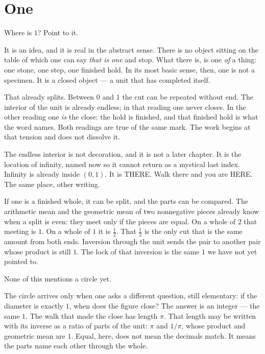 \documentclass[10pt,a4paper]{article}
\theoremstyle{plain}
\theoremstyle{definition}
\theoremstyle{remark}
\begin{document}
\newpage

\tableofcontents
\newpage

\section{One}

Where is \(1\)?
Point to it.

It is an idea, and it is real in the abstract sense.
There is no object sitting on the table of which one can say \emph{that is one} and stop.
What there is, is one \emph{of} a thing: one stone, one step, one finished hold.
In its most basic sense, then, one is not a specimen.
It is a closed object --- a unit that has completed itself.

That already splits.
Between \(0\) and \(1\) the cut can be repeated without end.
The interior of the unit is already endless; in that reading one never closes.
In the other reading one \emph{is} the close: the hold is finished, and that finished hold is what the word names.
Both readings are true of the same mark.
The work begins at that tension and does not dissolve it.

The endless interior is not decoration, and it is not a later chapter.
It is the location of infinity, named now so it cannot return as a mystical last index.
Infinity is already inside \((0,1)\).
It is THERE.
Walk there and you are HERE.
The same place, other writing.

If one is a finished whole, it can be split, and the parts can be compared.
The arithmetic mean and the geometric mean of two nonnegative pieces already know when a split is even: they meet only if the pieces are equal.
On a whole of \(2\) that meeting is \(1\).
On a whole of \(1\) it is \(\tfrac12\).
That \(\tfrac12\) is the only cut that is the same amount from both ends.
Inversion through the unit sends the pair to another pair whose product is still \(1\).
The lock of that inversion is the same \(1\) we have not yet pointed to.

None of this mentions a circle yet.

The circle arrives only when one asks a different question, still elementary: if the diameter is exactly \(1\), when does the figure close?
The answer is an integer --- the same \(1\).
The walk that made the close has length \(\pi\).
That length may be written with its inverse as a ratio of parts of the unit: \(\pi\) and \(1/\pi\), whose product and geometric mean are \(1\).
Equal, here, does not mean the decimals match.
It means the parts name each other through the whole.
\end{document}
